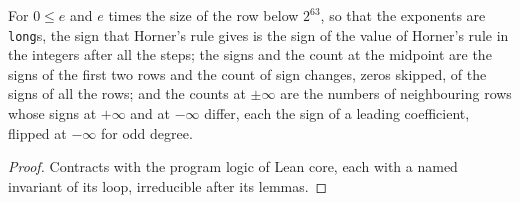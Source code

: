 \begin{lemma}\label{lem:evalSign}
  \leanok
  For $0 \le e$ and $e$ times the size of the row below $2^{63}$, so that the exponents are
  \verb|long|s, the sign that Horner's rule gives is the sign of the value of Horner's rule in the
  integers after all the steps; the signs and the count at the midpoint are the signs of the first
  two rows and the count of sign changes, zeros skipped, of the signs of all the rows; and the
  counts at $\pm\infty$ are the numbers of neighbouring rows whose signs at $+\infty$ and at
  $-\infty$ differ, each the sign of a leading coefficient, flipped at $-\infty$ for odd degree.
\end{lemma}

\begin{proof}\leanok
  Contracts with the program logic of Lean core, each with a named invariant of its loop,
  irreducible after its lemmas.
\end{proof}

